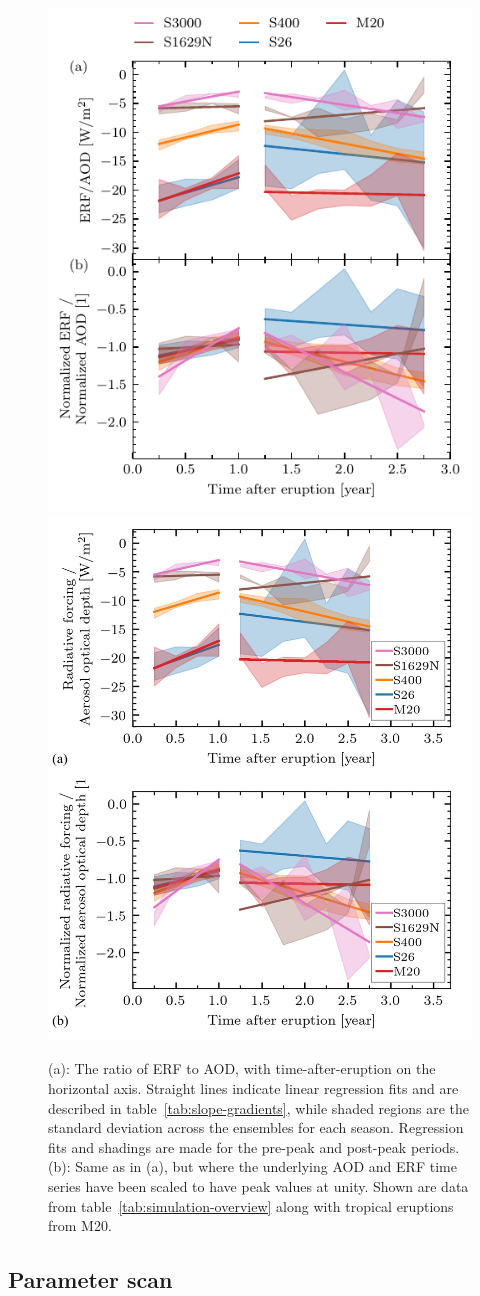\documentclass[draft]{agujournal2019}
\begin{document}
  \begin{figure}
    \centering \includegraphics[width=0.49\linewidth]{figure3}
    \includegraphics[width=0.49\linewidth]{figure3-alt}

    \caption{(a): The ratio of ERF to AOD, with
      time-after-eruption on the horizontal axis. Straight lines indicate linear
      regression fits and are described in table~\ref{tab:slope-gradients}, while shaded
      regions are the standard deviation across the ensembles for each season.
      Regression fits and shadings are made for the pre-peak and post-peak periods. (b):
      Same as in (a), but where the underlying AOD and ERF time series have been scaled
      to have peak values at unity. Shown are data from
      table~\ref{tab:simulation-overview} along with tropical eruptions from
      M20.}\label{fig:3_rf_to_aod_ratios}%
  \end{figure}

  \subsection{Parameter scan}
\end{document}

